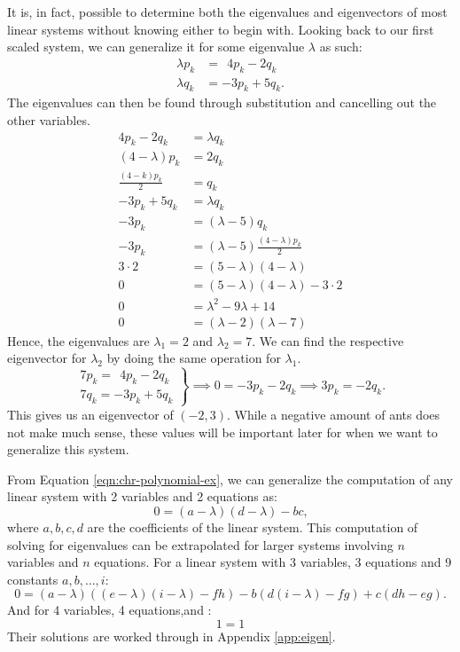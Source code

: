 It is, in fact, possible to determine both the eigenvalues and eigenvectors of most linear systems without knowing either to begin with.
Looking back to our first scaled system, we can generalize it for some eigenvalue $\lambda$ as such:
\begin{align*}
	\lambda p_k &=\ \ 4p_k - 2q_k \\
	\lambda q_k &= -3p_k + 5q_k \text{.}
\end{align*}
The eigenvalues can then be found through substitution and cancelling out the other variables.
\begin{align}
	4p_k - 2q_k &= \lambda q_k \nonumber \\
	(4 - \lambda)p_k &= 2q_k \nonumber \\
	\frac{(4 - k)p_k}{2} &= q_k \nonumber \\
	-3p_k + 5q_k &=\lambda q_k \nonumber \\
	-3p_k &= (\lambda - 5)q_k \nonumber \\
	-3p_k &= (\lambda - 5)\frac{(4 - \lambda)p_k}{2} \nonumber \\
	3\cdot2 &= (5 - \lambda)(4 - \lambda) \nonumber \\
	0 &= (5 - \lambda)(4 - \lambda) - 3\cdot2 \label{eqn:chr-polynomial-ex} \\
	0 &= \lambda^2 - 9\lambda + 14 \nonumber \\
	0 &= (\lambda -2)(\lambda -7) \nonumber
\end{align}
Hence, the eigenvalues are $\lambda_1 = 2$ and $\lambda_2 = 7$.
We can find the respective eigenvector for $\lambda_2$ by doing the same operation for $\lambda_1$.
\begin{equation*}
	\left. \begin{array}{l}
		7p_k =\ \ 4p_k - 2q_k \\
		7q_k = -3p_k + 5q_k
	\end{array} \right \} \implies
	0 = -3p_k - 2q_k \implies
	3p_k = -2q_k \text{.}
\end{equation*}
This gives us an eigenvector of $(-2,3)$.
While a negative amount of ants does not make much sense, these values will be important later for when we want to generalize this system.

From Equation \eqref{eqn:chr-polynomial-ex}, we can generalize the computation of any linear system with 2 variables and 2 equations as:
\begin{equation*}
	0 = (a - \lambda)(d - \lambda) - bc \text{,}
\end{equation*}
where $a,b,c,d$ are the coefficients of the linear system. This computation of solving for eigenvalues can be extrapolated for larger systems involving $n$ variables and $n$ equations.
For a linear system with 3 variables, 3 equations and 9 constants $a, b, \dots, i$:
\begin{equation*}
	0 = (a - \lambda)((e - \lambda)(i - \lambda) - fh) - b(d(i - \lambda) - fg) + c(dh - eg) \text{.}
\end{equation*}
And for 4 variables, 4 equations,and :
\begin{equation*}
	1 = 1 
\end{equation*}
Their solutions are worked through in Appendix \ref{app:eigen}.


